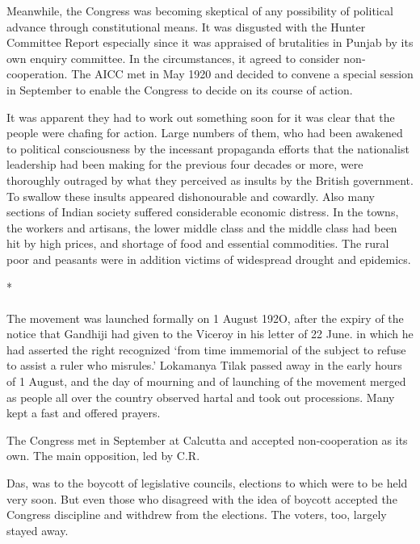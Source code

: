 Meanwhile, the Congress was becoming skeptical of any possibility of political advance through constitutional means. It was disgusted with the Hunter Committee Report especially since it was appraised of brutalities in Punjab by its own enquiry committee. In the circumstances, it agreed to consider non­ cooperation. The AICC met in May 1920 and decided to convene a special session in September to enable the Congress to decide on its course of action. 

It was apparent they had to work out something soon for it was clear that the people were chafing for action. Large numbers of them, who had been awakened to political consciousness by the incessant propaganda efforts that the nationalist leadership had been making for the previous four decades or more, were thoroughly outraged by what they perceived as insults by the British government. To swallow these insults appeared dishonourable and cowardly. Also many sections of Indian society suffered considerable economic distress. In the towns, the workers and artisans, the lower middle class and the middle class had been hit by high prices, and shortage of food and essential commodities. The rural poor and peasants were in addition victims of widespread drought and epidemics.

\begin{center}*\end{center}

\paragraph*{}


The movement was launched formally on 1 August 192O, after the expiry of the notice that Gandhiji had given to the Viceroy in his letter of 22 June. in which he had asserted the right recognized `from time immemorial of the subject to refuse to assist a ruler who misrules.' Lokamanya Tilak passed away in the early hours of 1 August, and the day of mourning and of launching of the movement merged as people all over the country observed hartal and took out processions. Many kept a fast and offered prayers. 

The Congress met in September at Calcutta and accepted non-cooperation as its own. The main opposition, led by C.R. 

Das, was to the boycott of legislative councils, elections to which were to be held very soon. But even those who disagreed with the idea of boycott accepted the Congress discipline and withdrew from the elections. The voters, too, largely stayed away. 

